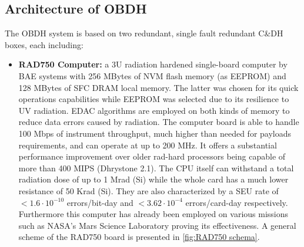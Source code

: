 \subsection{Architecture of OBDH}
\label{subsec:OBDH_architecture}

The OBDH system is based on two redundant, single fault redundant C\&DH boxes, each including:
\begin{itemize}
    \item \textbf{RAD750 Computer:} a 3U radiation hardened single-board computer by BAE systems \cite{C&DH_power} with 256 MBytes of NVM flash memory (as EEPROM) and 128 MBytes of SFC DRAM local memory. \cite{juno_sito} The latter was chosen for its quick operations capabilities while EEPROM was selected due to its resilience to UV radiation. EDAC algorithms are employed on both kinds of memory to reduce data errors caused by radiation. The computer board is able to handle 100 Mbps of instrument throughput, much higher than needed for payloads requirements, and can operate at up to 200 MHz. It offers a substantial performance improvement over older rad-hard processors being capable of more than 400 MIPS (Dhrystone 2.1). The CPU itself can withstand a total radiation dose of up to 1 Mrad (Si) while the whole card has a much lower resistance of 50 Krad (Si). They are also characterized by a SEU rate of $<1.6 \cdot 10^{-10}$ errors/bit-day and $<3.62 \cdot 10^{-4}$ errors/card-day respectively. \cite{RAD750} Furthermore this computer has already been employed on various missions such as NASA's Mars Science Laboratory proving its effectiveness. \cite{batterie} 
    A general scheme of the RAD750 board is presented in \autoref{fig:RAD750 schema}.
    


\end{itemize}
